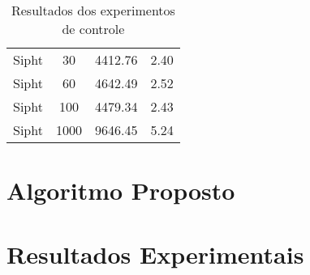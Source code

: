\begin{table}
\begin{tabular}{|c|c|c|c|}
    Sipht                          & 30                & 4412.76            & 2.40                     \\
    Sipht                          & 60                & 4642.49            & 2.52                     \\
    Sipht                          & 100               & 4479.34            & 2.43                     \\
    Sipht                          & 1000              & 9646.45            & 5.24                     \\ \hline
    \end{tabular}
    \caption {Resultados dos experimentos de controle}
    \label{tab:resultados_dvfs}
\end{table}



\section{Algoritmo Proposto}
\label{sec:algoritmo_proposto}

\section{Resultados Experimentais}
\label{sec:resultados_experimentais}

